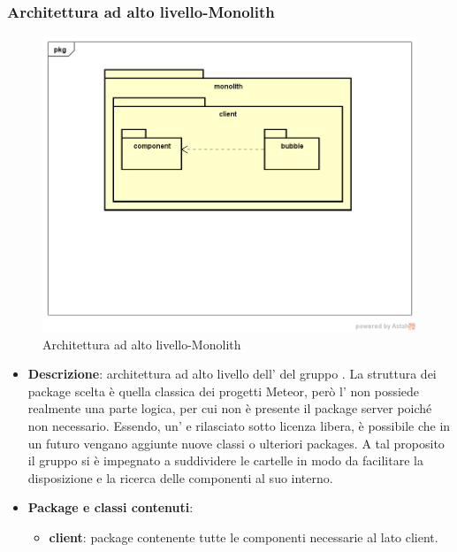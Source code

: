 \subsubsection{Architettura ad alto livello-Monolith}
\label{Monolith}
\begin{figure}[H]
	\centering
	\includegraphics[scale=0.5]{Sezioni/Packages/SDK/Monolith.png}
	\caption{Architettura ad alto livello-Monolith}
\end{figure}
\begin{itemize}
	\item{\textbf{Descrizione}}: architettura ad alto livello dell’  del gruppo \gruppo. La struttura dei package scelta è quella classica dei progetti Meteor, però l' non possiede realmente una parte logica, per cui non è presente il package server poiché non necessario. Essendo, un' e rilasciato sotto licenza libera, è possibile che in un futuro vengano aggiunte nuove classi o ulteriori packages. A tal proposito il gruppo si è impegnato a suddividere le cartelle in modo da facilitare la disposizione e la ricerca delle componenti al suo interno.
	\item{\textbf{Package e classi contenuti}}:
	\begin{itemize}
	\item \textbf{client}: package contenente tutte le componenti necessarie al lato client.
	\end{itemize}

\end{itemize}

